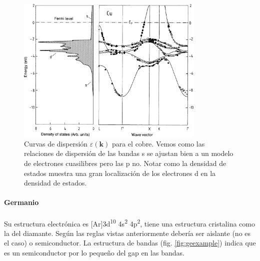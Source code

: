 \begin{figure}
  \centering
  \includegraphics[width=0.8\textwidth]{figures/cuexample.png}
  \caption{Curvas de dispersión $\varepsilon(\mathbf{k})$ para el
    cobre. Vemos como las relaciones de dispersión de las bandas s se
    ajustan bien a un modelo de electrones cuasilibres pero las p
    no. Notar como la densidad de estados muestra una gran
    localización de los electrones d en la densidad de estados.}
  \label{fig:cuexample}
\end{figure}

\paragraph{Germanio}
Su estructura electrónica es [Ar]3d\textsuperscript {10}
4s\textsuperscript 2 4p\textsuperscript 2, tiene una estructura
cristalina como la del diamante. Según las reglas vistas anteriormente
debería ser aislante (no es el caso) o semiconductor. La estructura de
bandas (fig. \ref{fig:geexample}) indica que es un semiconductor por
lo pequeño del gap en las bandas.


